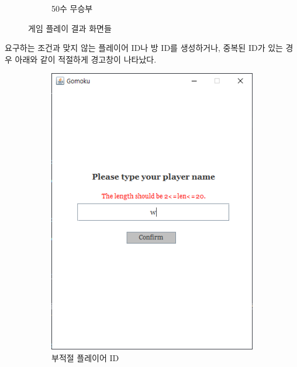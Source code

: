 \documentclass[a4paper, 10pt]{article}
\begin{document}
\begin{figure}[h]
\begin{subfigure}{.3\textwidth}
    \caption{50수 무승부}
    \label{fig:draw}
  \end{subfigure}
  \caption{게임 플레이 결과 화면들}
\end{figure}

요구하는 조건과 맞지 않는 플레이어 ID나 방 ID를 생성하거나, 중복된 ID가 있는
경우 아래와 같이 적절하게 경고창이 나타났다.
\begin{figure}[h]
  \centering
  \begin{subfigure}{.24\textwidth}
    \centering
    \includegraphics[width=.9\linewidth]{resource/improper_playerID}
    \caption{부적절 플레이어 ID}
    \label{fig:improper_playerID}
  \end{subfigure}
  \begin{subfigure}{.24\textwidth}
    \centering

\end{subfigure}
\end{figure}
\end{document}
